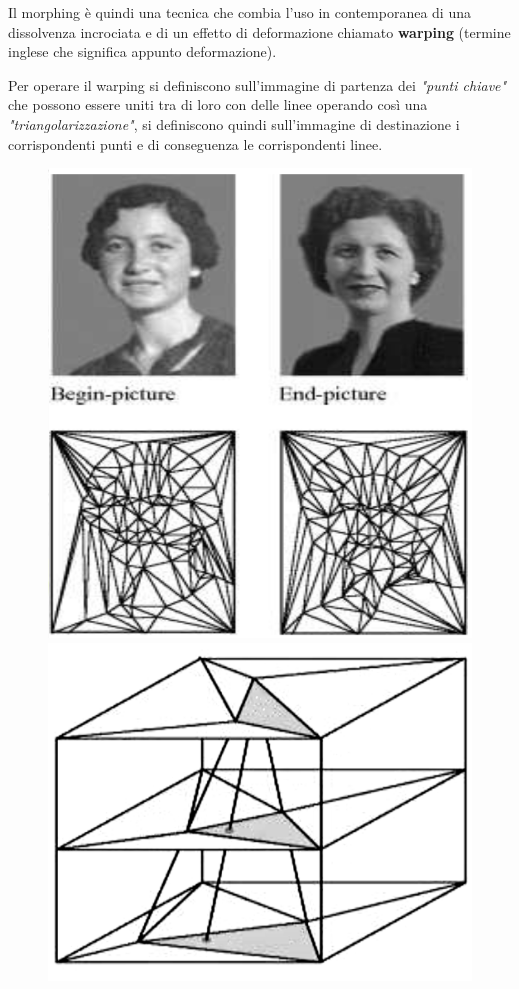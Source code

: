 \vspace{1em} \noindent
Il morphing è quindi una tecnica che combia l'uso in contemporanea di una dissolvenza incrociata e di un effetto di deformazione chiamato \textbf{warping} (termine inglese che significa appunto deformazione).

\vspace{1em} \noindent
Per operare il warping si definiscono sull'immagine di partenza dei \textit{"punti chiave"} che possono essere uniti tra di loro con delle linee operando così una \textit{"triangolarizzazione"}, si definiscono quindi sull'immagine di destinazione i corrispondenti punti e di conseguenza le corrispondenti linee.\\ 

\begin{figure}[htb] \centering
\includegraphics[scale=0.3, clip]{Pictures/triangolarizzazione.png}
\qquad \qquad
\includegraphics[scale=0.09, clip]{Pictures/Processo morphing.png}

\end{figure}
